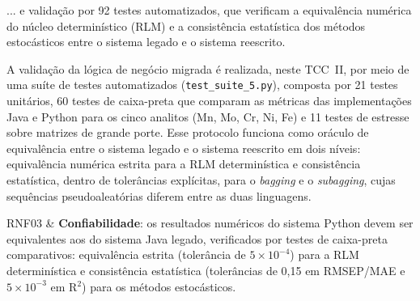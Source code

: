 

... e validação por 92 testes automatizados, que verificam a equivalência
numérica do núcleo determinístico (RLM) e a consistência estatística dos
métodos estocásticos entre o sistema legado e o sistema reescrito.


A validação da lógica de negócio migrada é realizada, neste TCC~II, por
meio de uma suíte de testes automatizados (\texttt{test\_suite\_5.py}),
composta por 21 testes unitários, 60 testes de caixa-preta que comparam
as métricas das implementações Java e Python para os cinco analitos (Mn,
Mo, Cr, Ni, Fe) e 11 testes de estresse sobre matrizes de grande porte.
Esse protocolo funciona como oráculo de equivalência entre o sistema
legado e o sistema reescrito em dois níveis: equivalência numérica estrita
para a RLM determinística e consistência estatística, dentro de
tolerâncias explícitas, para o \textit{bagging} e o \textit{subagging},
cujas sequências pseudoaleatórias diferem entre as duas linguagens.


RNF03 & \textbf{Confiabilidade}: os resultados numéricos do sistema Python
devem ser equivalentes aos do sistema Java legado, verificados por testes de
caixa-preta comparativos: equivalência estrita (tolerância de
$5\times10^{-4}$) para a RLM determinística e consistência estatística
(tolerâncias de 0,15 em RMSEP/MAE e $5\times10^{-3}$ em R$^2$) para os
métodos estocásticos. \\ \hline


